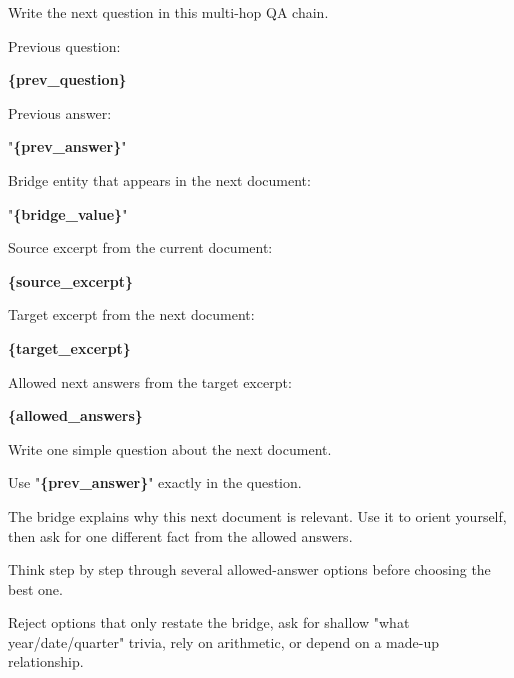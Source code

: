 \begin{tcolorbox}[colback=white, colframe=my-green, coltitle=black, parskip=5mm, title=\textbf{Next-Hop Question, Pick Target}, halign=flush left, enhanced, breakable, skin first=enhanced, skin middle=enhanced, skin last=enhanced]
\begin{scriptsize}
\ttfamily
\setlength{\parindent}{0pt}
Write the next question in this multi-hop QA chain.\par
\mbox{}\par
Previous question:\par
\textcolor{my-green}{\textbf{\{prev\_question\}}}\par
\mbox{}\par
Previous answer:\par
"\textcolor{my-green}{\textbf{\{prev\_answer\}}}"\par
\mbox{}\par
Bridge entity that appears in the next document:\par
"\textcolor{my-green}{\textbf{\{bridge\_value\}}}"\par
\mbox{}\par
Source excerpt from the current document:\par
\textcolor{my-green}{\textbf{\{source\_excerpt\}}}\par
\mbox{}\par
Target excerpt from the next document:\par
\textcolor{my-green}{\textbf{\{target\_excerpt\}}}\par
\mbox{}\par
Allowed next answers from the target excerpt:\par
\textcolor{my-green}{\textbf{\{allowed\_answers\}}}\par
\mbox{}\par
Write one simple question about the next document.\par
Use "\textcolor{my-green}{\textbf{\{prev\_answer\}}}" exactly in the question.\par
The bridge explains why this next document is relevant. Use it to orient yourself, then ask for one different fact from the allowed answers.\par
Think step by step through several allowed-answer options before choosing the best one.\par
Reject options that only restate the bridge, ask for shallow "what year/date/quarter" trivia, rely on arithmetic, or depend on a made-up relationship.\par

\end{scriptsize}
\end{tcolorbox}
